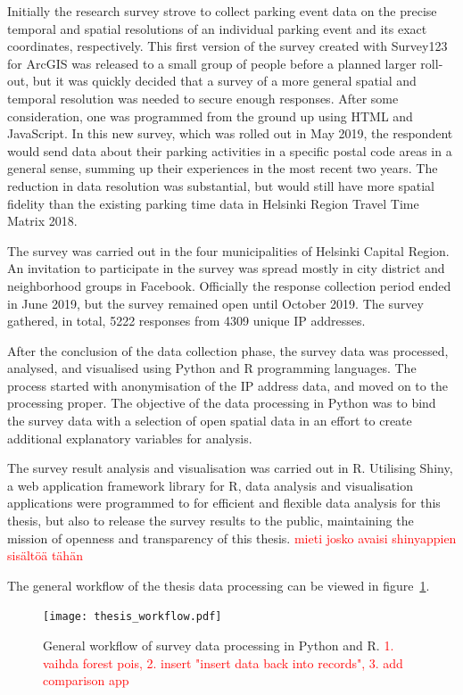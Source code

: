 Initially the research survey strove to collect parking event data on the precise temporal and spatial resolutions of an individual parking event and its exact coordinates, respectively. This first version of the survey created with Survey123 for ArcGIS was released to a small group of people before a planned larger roll-out, but it was quickly decided that a survey of a more general spatial and temporal resolution was needed to secure enough responses. After some consideration, one was programmed from the ground up using HTML and JavaScript. In this new survey, which was rolled out in May 2019, the respondent would send data about their parking activities in a specific postal code areas in a general sense, summing up their experiences in the most recent two years. The reduction in data resolution was substantial, but would still have more spatial fidelity than the existing parking time data in Helsinki Region Travel Time Matrix 2018.

The survey was carried out in the four municipalities of Helsinki Capital Region. An invitation to participate in the survey was spread mostly in city district and neighborhood groups in Facebook. Officially the response collection period ended in June 2019, but the survey remained open until October 2019. The survey gathered, in total, 5222 responses from 4309 unique IP addresses.

After the conclusion of the data collection phase, the survey data was processed, analysed, and visualised using Python and R programming languages. The process started with anonymisation of the IP address data, and moved on to the processing proper. The objective of the data processing in Python was to bind the survey data with a selection of open spatial data in an effort to create additional explanatory variables for analysis.

The survey result analysis and visualisation was carried out in R. Utilising Shiny, a web application framework library for R, data analysis and visualisation applications were programmed to for efficient and flexible data analysis for this thesis, but also to release the survey results to the public, maintaining the mission of openness and transparency of this thesis. \textcolor{red}{mieti josko avaisi shinyappien sisältöä tähän}

The general workflow of the thesis data processing can be viewed in figure~\ref{fig:gen_workflow}.

\begin{figure}[H]
    \centering
    \texttt{[image: thesis\_workflow.pdf]}
    \caption{General workflow of survey data processing in Python and R. \textcolor{red}{1. vaihda forest pois, 2. insert "insert data back into records", 3. add comparison app}}
    \label{fig:gen_workflow}
\end{figure}
\pagebreak

